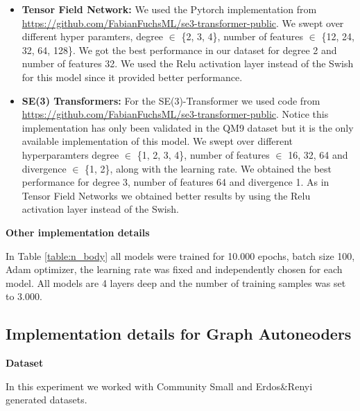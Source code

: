 \begin{itemize}
    \item \textbf{Tensor Field Network:} We used the Pytorch implementation from  \hyperlink{https://github.com/FabianFuchsML/se3-transformer-public}{https://github.com/FabianFuchsML/se3-transformer-public}. We swept over different hyper paramters, degree $\in$ \{2, 3, 4\}, number of features $\in$ \{12, 24, 32, 64, 128\}. We got the best performance in our dataset for degree 2 and number of features 32. We used the Relu activation layer instead of the Swish for this model since it provided better performance.
    
    \item \textbf{SE(3) Transformers:} For the SE(3)-Transformer we used code from \hyperlink{https://github.com/FabianFuchsML/se3-transformer-public}{https://github.com/FabianFuchsML/se3-transformer-public}. Notice this implementation has only been validated in the QM9 dataset but it is the only available implementation of this model. We swept over different hyperparamters degree $\in$ \{1, 2, 3, 4\}, number of features $\in$ 16, 32, 64 and divergence $\in$ \{1, 2\}, along with the learning rate. We obtained the best performance for degree 3, number of features 64 and divergence 1. As in Tensor Field Networks we obtained better results by using the Relu activation layer instead of the Swish.
\end{itemize}

\textbf{Other implementation details}

In Table \ref{table:n_body} all models were trained for 10.000 epochs, batch size 100, Adam optimizer, the learning rate was fixed and independently chosen for each model. All models are 4 layers deep and the number of training samples was set to 3.000.

\subsection{Implementation details for Graph Autoneoders}
\label{sec:appendix_implementation_graph_autoencoders}

\textbf{Dataset}

In this experiment we worked with Community Small \cite{you2018graphrnn} and Erdos\&Renyi \cite{bollobas2001random} generated datasets.


